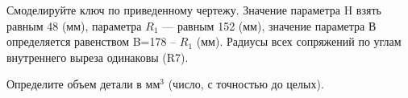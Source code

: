 
Смоделируйте ключ по приведенному чертежу. Значение параметра H взять равным 48 (мм), параметра $R_1$ — равным 152 (мм), 
значение параметра В определяется равенством B=178 – $R_1$ (мм).   Радиусы всех сопряжений по углам внутреннего выреза одинаковы (R7).


Определите объем детали в мм$^3$  (число, с точностью до целых).

